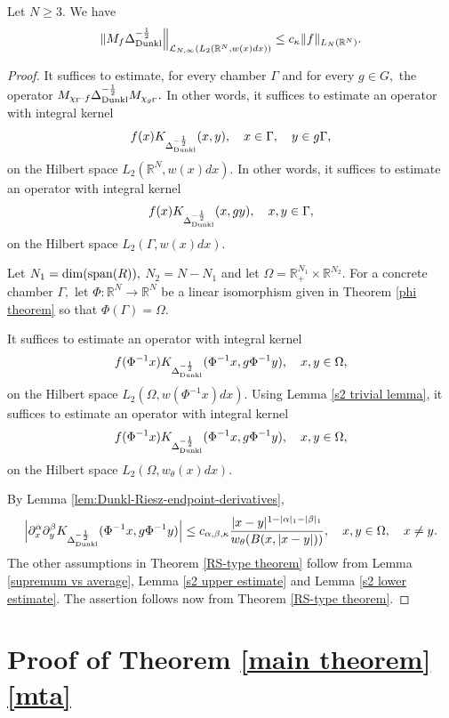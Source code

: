 \documentclass{amsart}
\begin{document}
\begin{theorem}\label{dunkl cwikel theorem} Let $N\geq 3.$ We have
$$\|M_f\Delta_{{\rm Dunkl}}^{-\frac12}\Big\|_{\mathcal{L}_{N,\infty}(L_2(\mathbb{R}^N,w(x)dx))}\leq c_{\kappa}\|f\|_{L_N(\mathbb{R}^N)}.$$
\end{theorem}
\begin{proof} It suffices to estimate, for every chamber $\Gamma$ and for every $g\in G,$ the operator $M_{\chi_{\Gamma}\cdot f}\Delta_{{\rm Dunkl}}^{-\frac12}M_{\chi_{g\Gamma}}.$ In other words, it suffices to estimate an operator with integral kernel
$$f(x)K_{\Delta_{{\rm Dunkl}}^{-\frac12}}(x,y),\quad x\in\Gamma,\quad y\in g\Gamma,$$
on the Hilbert space $L_2(\mathbb{R}^N,w(x)dx).$ In other words, it suffices to estimate an operator with integral kernel
$$f(x)K_{\Delta_{{\rm Dunkl}}^{-\frac12}}(x,gy),\quad x,y\in\Gamma,$$
on the Hilbert space $L_2(\Gamma,w(x)dx).$

Let $N_1={\rm dim}({\rm span}(R)),$ $N_2=N-N_1$ and let $\Omega=\mathbb{R}_+^{N_1}\times\mathbb{R}^{N_2}.$ For a concrete chamber $\Gamma,$ let $\Phi:\mathbb{R}^N\to\mathbb{R}^N$ be a linear isomorphism given in Theorem \ref{phi theorem} so that $\Phi(\Gamma)=\Omega.$

It suffices to estimate an operator with integral kernel
$$f(\Phi^{-1}x)K_{\Delta_{{\rm Dunkl}}^{-\frac12}}(\Phi^{-1}x,g\Phi^{-1}y),\quad x,y\in\Omega,$$
on the Hilbert space $L_2(\Omega,w(\Phi^{-1}x)dx).$ Using Lemma \ref{s2 trivial lemma}, it suffices to estimate an operator with integral kernel
$$f(\Phi^{-1}x)K_{\Delta_{{\rm Dunkl}}^{-\frac12}}(\Phi^{-1}x,g\Phi^{-1}y),\quad x,y\in\Omega,$$
on the Hilbert space $L_2(\Omega,w_{\theta}(x)dx).$

By Lemma \ref{lem:Dunkl-Riesz-endpoint-derivatives},
$$\Big|\partial^{\alpha}_x\partial^{\beta}_yK_{\Delta_{{\rm Dunkl}}^{-\frac12}}(\Phi^{-1}x,g\Phi^{-1}y)\Big|\leq c_{\alpha,\beta,\kappa}\frac{|x-y|^{1-|\alpha|_1-|\beta|_1}}{w_{\theta}(B(x,|x-y|))},\quad x,y\in\Omega,\quad x\neq y.$$
The other assumptions in Theorem \ref{RS-type theorem} follow from Lemma \ref{supremum vs average}, Lemma \ref{s2 upper estimate} and Lemma \ref{s2 lower estimate}. The assertion follows now from Theorem \ref{RS-type theorem}.
\end{proof}

\section{Proof of Theorem \ref{main theorem} \eqref{mta}}
\end{document}

